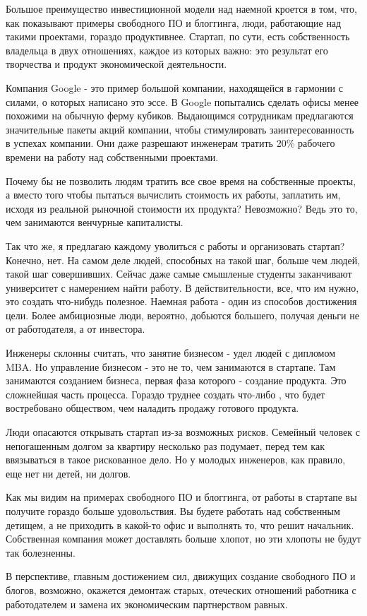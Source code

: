 \documentclass[ebook,12pt,oneside,openany]{memoir}
\begin{document}
Большое преимущество инвестиционной модели над наемной кроется в том,
что, как показывают примеры свободного ПО и блоггинга, люди,
работающие над такими проектами, гораздо продуктивнее. Стартап, по
сути, есть собственность владельца в двух отношениях, каждое из
которых важно: это результат его творчества и продукт экономической
деятельности.

Компания Google - это пример большой компании, находящейся в гармонии
с силами, о которых написано это эссе. В Google попытались сделать
офисы менее похожими на обычную ферму кубиков. Выдающимся сотрудникам
предлагаются значительные пакеты акций компании, чтобы стимулировать
заинтересованность в успехах компании. Они даже разрешают инженерам
тратить 20\% рабочего времени на работу над собственными проектами.

Почему бы не позволить людям тратить все свое время на собственные
проекты, а вместо того чтобы пытаться вычислить стоимость их работы,
заплатить им, исходя из реальной рыночной стоимости их продукта?
Невозможно? Ведь это то, чем занимаются венчурные капиталисты.

Так что же, я предлагаю каждому уволиться с работы и организовать
стартап? Конечно, нет. На самом деле людей, способных на такой шаг,
больше чем людей, такой шаг совершивших. Сейчас даже самые смышленые
студенты заканчивают университет с намерением найти работу. В
действительности, все, что им нужно, это создать что-нибудь полезное.
Наемная работа - один из способов достижения цели. Более амбициозные
люди, вероятно, добьются большего, получая деньги не от работодателя,
а от инвестора.

Инженеры склонны считать, что занятие бизнесом - удел людей с дипломом
MBA. Но управление бизнесом - это не то, чем занимаются в стартапе.
Там занимаются созданием бизнеса, первая фаза которого - создание
продукта. Это сложнейшая часть процесса. Гораздо труднее создать
что-либо , что будет востребовано обществом, чем наладить продажу
готового продукта.

Люди опасаются открывать стартап из-за возможных рисков. Семейный
человек с непогашенным долгом за квартиру несколько раз подумает,
перед тем как ввязываться в такое рискованное дело. Но у молодых
инженеров, как правило, еще нет ни детей, ни долгов.

Как мы видим на примерах свободного ПО и блоггинга, от работы в
стартапе вы получите гораздо больше удовольствия. Вы будете работать
над собственным детищем, а не приходить в какой-то офис и выполнять
то, что решит начальник. Собственная компания может доставлять больше
хлопот, но эти хлопоты не будут так болезненны.

В перспективе, главным достижением сил, движущих создание свободного
ПО и блогов, возможно, окажется демонтаж старых, отеческих отношений
работника с работодателем и замена их экономическим партнерством
равных.
\end{document}

